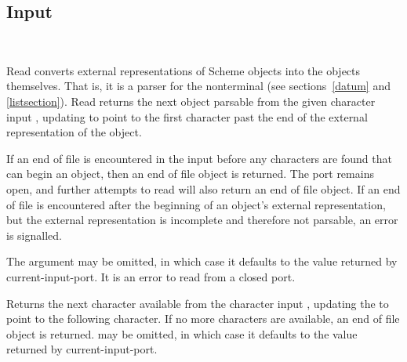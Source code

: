 \subsection{Input}
\label{inputsection}

\noindent \hbox{ }  %
\vspace{-5ex}

\begin{entry}{%
}

{\cf Read} converts external representations of Scheme objects into the
objects themselves.  That is, it is a parser for the nonterminal
 (see sections~\ref{datum} and
\ref{listsection}).  {\cf Read} returns the next
object parsable from the given character input , updating
 to point to
the first character past the end of the external representation of the object.

\vest If an end of file is encountered in the input before any
characters are found that can begin an object, then an end of file
object is returned.  \todo{} The port remains open, and further attempts
to read will also return an end of file object.  If an end of file is
encountered after the beginning of an object's external representation,
but the external representation is incomplete and therefore not parsable,
an error is signalled.

The  argument may be omitted, in which case it defaults to the
value returned by {\cf current-input-port}.  It is an error to read from
a closed port.
\end{entry}

\begin{entry}{%
}

Returns the next character available from the character input ,
updating
the  to point to the following character.  If no more characters
are available, an end of file object is returned.   may be
omitted, in which case it defaults to the value returned by {\cf current-input-port}.

\end{entry}


